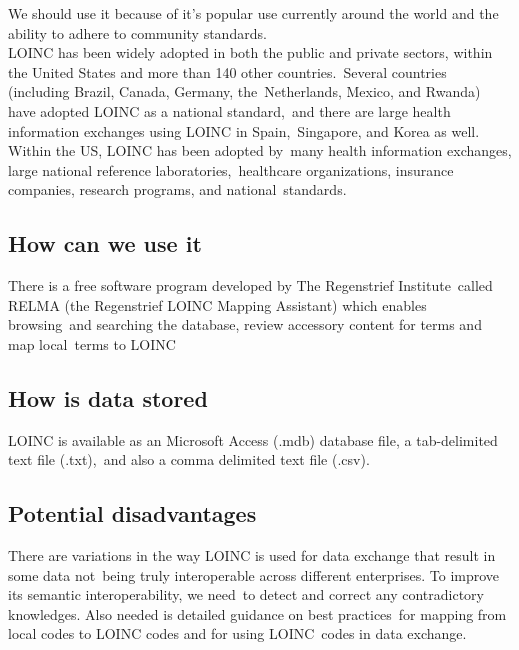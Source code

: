 We should use it because of it's popular use currently around the world and the ability to adhere to community standards.\\

LOINC has been widely adopted in both the public and private\noindent
sectors, within the United States and more than 140 other countries.\
Several countries (including Brazil, Canada, Germany, the\
Netherlands, Mexico, and Rwanda) have adopted LOINC as a national standard,\
 and there are large health information exchanges using LOINC in Spain,\
 Singapore, and Korea as well. Within the US, LOINC has been adopted by\
 many health information exchanges, large national reference laboratories,\
 healthcare organizations, insurance companies, research programs, and national\
standards.\citep{kroth_using_2012} 

 \subsection{How can we use it}

  There is a free software program developed by The Regenstrief Institute\
  called RELMA (the Regenstrief LOINC Mapping Assistant) which enables browsing\
  and searching the database, review accessory content for terms and map local\
  terms to LOINC \citep{kroth_using_2012} 

  \subsection{How is data stored}

LOINC is available as an Microsoft Access (.mdb) database file, a tab-delimited text file (.txt),\
 and also a comma delimited text file (.csv).\citep{_Vreeman_2013}\

 \subsection{Potential disadvantages}

 There are variations in the way LOINC is used for data exchange that result in some data not\
being truly interoperable across different enterprises. To improve its semantic interoperability, we need\
to detect and correct any contradictory knowledges. Also needed is detailed guidance on best practices\
for mapping from local codes to LOINC codes and for using LOINC\ 
codes in data exchange. \citep{lin_auditing_2012}




